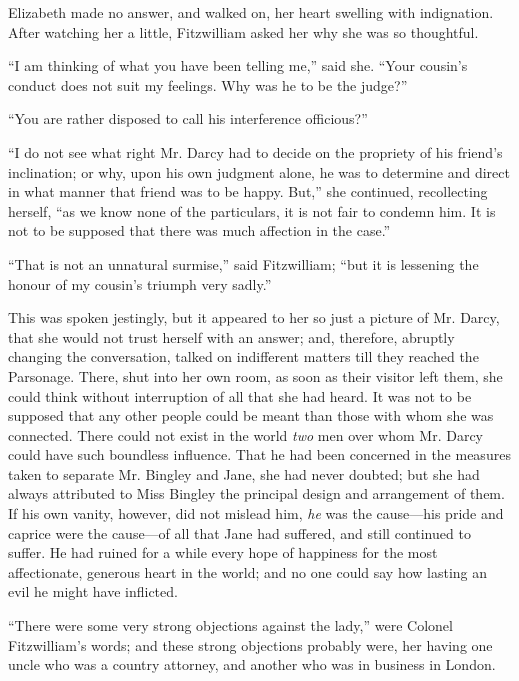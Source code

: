 Elizabeth made no answer, and walked on, her heart swelling with indignation. After watching her a little, Fitzwilliam asked her why she was so thoughtful.

``I am thinking of what you have been telling me,'' said she. ``Your cousin's conduct does not suit my feelings. Why was he to be the judge?''

``You are rather disposed to call his interference officious?''

``I do not see what right Mr. Darcy had to decide on the propriety of his friend's inclination; or why, upon his own judgment alone, he was to determine and direct in what manner that friend was to be happy. But,'' she continued, recollecting herself, ``as we know none of the particulars, it is not fair to condemn him. It is not to be supposed that there was much affection in the case.''

``That is not an unnatural surmise,'' said Fitzwilliam; ``but it is lessening the honour of my cousin's triumph very sadly.''

This was spoken jestingly, but it appeared to her so just a picture of Mr. Darcy, that she would not trust herself with an answer; and, therefore, abruptly changing the conversation, talked on indifferent matters till they reached the Parsonage. There, shut into her own room, as soon as their visitor left them, she could think without interruption of all that she had heard. It was not to be supposed that any other people could be meant than those with whom she was connected. There could not exist in the world \textit{two} men over whom Mr. Darcy could have such boundless influence. That he had been concerned in the measures taken to separate Mr. Bingley and Jane, she had never doubted; but she had always attributed to Miss Bingley the principal design and arrangement of them. If his own vanity, however, did not mislead him, \textit{he} was the cause---his pride and caprice were the cause---of all that Jane had suffered, and still continued to suffer. He had ruined for a while every hope of happiness for the most affectionate, generous heart in the world; and no one could say how lasting an evil he might have inflicted.

``There were some very strong objections against the lady,'' were Colonel Fitzwilliam's words; and these strong objections probably were, her having one uncle who was a country attorney, and another who was in business in London.

